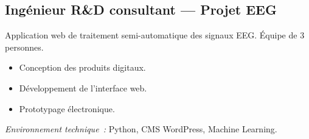 \documentclass[10pt,a4paper]{article}
\begin{document}
\vspace{4pt}

\subsection*{Ingénieur R\&D consultant --- Projet EEG}
\color{darkgray}
Application web de traitement semi-automatique des signaux EEG. Équipe de 3 personnes.
\begin{itemize}
  \item Conception des produits digitaux.
  \item Développement de l'interface web.
  \item Prototypage électronique.
\end{itemize}
\textit{Environnement technique~:} Python, CMS WordPress, Machine Learning.

\vspace{14pt}
\end{document}
